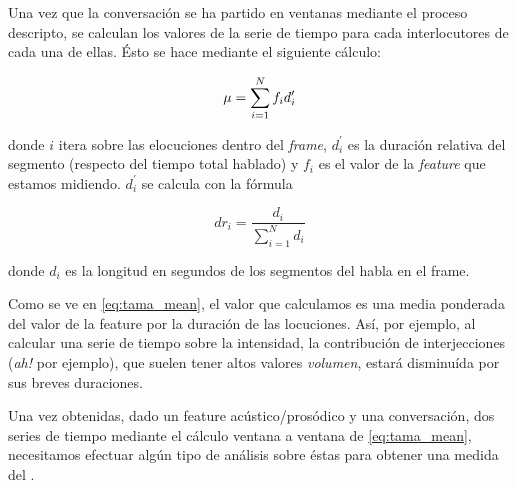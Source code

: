 Una vez que la conversación se ha partido en ventanas mediante el proceso descripto, se calculan los valores de la serie de tiempo para cada interlocutores de cada una de ellas. Ésto se hace mediante el siguiente cálculo:

\begin{equation}
    \mu = \sum\limits_{i=1}^N f_i d_i^\prime \label{eq:tama_mean}\\
\end{equation}

donde $i$ itera sobre las elocuciones dentro del \emph{frame}, $d_i^\prime$ es la duración relativa del segmento (respecto del tiempo total hablado) y $f_i$ es el valor de la \emph{feature} que estamos midiendo. $d_i^\prime$ se calcula con la fórmula

\begin{equation}
dr_i = \frac{d_i}{\sum\limits_{i=1}^N d_i}
\end{equation}

donde $d_i$ es la longitud en segundos de los segmentos del habla en el frame.

Como se ve en \ref{eq:tama_mean}, el valor que calculamos es una media ponderada del valor de la feature por la duración de las locuciones. Así, por ejemplo, al calcular una serie de tiempo sobre la intensidad, la contribución de interjecciones (\emph{ah!} por ejemplo), que suelen tener altos valores \emph{volumen}, estará disminuída por sus breves duraciones.

Una vez obtenidas, dado un feature acústico/prosódico y una conversación, dos series de tiempo mediante el cálculo ventana a ventana de \ref{eq:tama_mean}, necesitamos efectuar algún tipo de análisis sobre éstas para obtener una medida del \entrainment.


